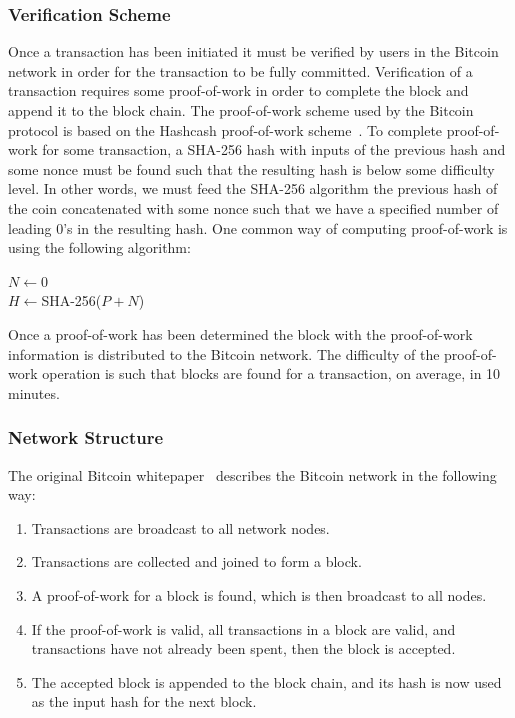 \documentclass[11pt]{article}
\begin{document}
\subsubsection{Verification Scheme}
Once a transaction has been initiated it must be verified by users in the
Bitcoin network in order for the transaction to be fully committed. Verification
of a transaction requires some proof-of-work in order to complete the block and
append it to the block chain. The proof-of-work scheme used by the Bitcoin
protocol is based on the Hashcash proof-of-work scheme~\cite{back02}. 
To complete proof-of-work for some transaction, a
SHA-256 hash with inputs of the previous hash and some nonce must be found such
that the resulting hash is below some difficulty level. In other words, we must
feed the SHA-256 algorithm the previous hash of the coin concatenated with some
nonce such that we have a specified number of leading 0's in the resulting hash.
One common way of computing proof-of-work is using the following algorithm:
\vspace{1em}\\
\begin{algorithm}[H]
    $N \gets 0$\\
    $H \gets ${\sc SHA-256($P + N$)}\\
\end{algorithm}\vspace{1em}

Once a proof-of-work has been determined the block with the proof-of-work
information is distributed to the Bitcoin network. The difficulty of the
proof-of-work operation is such that blocks are found for a transaction, on
average, in 10 minutes.

\subsubsection{Network Structure}
The original Bitcoin whitepaper~\cite{nakamoto08} describes the Bitcoin network in the following
way:
\begin{enumerate}
    \item Transactions are broadcast to all network nodes.
    \item Transactions are collected and joined to form a block.
    \item A proof-of-work for a block is found, which is then broadcast to all nodes.
    \item If the proof-of-work is valid, all transactions in a block are valid,
        and transactions have not already been spent, then the block is accepted.
    \item The accepted block is appended to the block chain, and its hash is now
        used as the input hash for the next block.
\end{enumerate}
\end{document}
